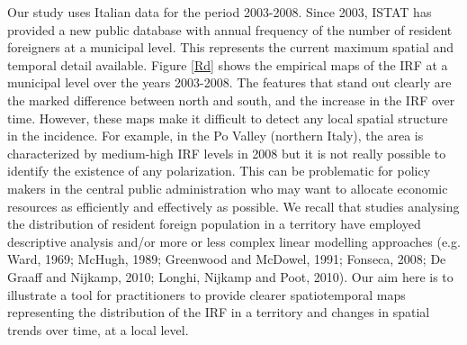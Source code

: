 \documentclass[12pt]{article}
\theoremstyle{definition}
\theoremstyle{plain}
\begin{document}
Our study uses Italian data for the period 2003-2008. Since 2003, ISTAT has provided a new public database with annual frequency of the number of resident foreigners at a municipal level. This represents the current maximum spatial and temporal detail available. Figure \ref{Rd} shows the empirical maps of the IRF at a municipal level over the years 2003-2008. The features that stand out clearly are the marked difference between north and south, and the increase in the IRF over time. However, these maps make it difficult to detect any local spatial structure in the incidence. For example, in the Po Valley (northern Italy), the area is characterized by medium-high IRF levels in 2008 but it is not really possible to identify the existence of any polarization. This can be problematic for policy makers in the central public administration who may want to allocate economic resources as efficiently and effectively as possible. We recall that studies analysing the distribution of resident foreign population in a territory have employed descriptive analysis and/or more or less complex linear modelling approaches (e.g. Ward, 1969; McHugh, 1989; Greenwood and McDowel, 1991; Fonseca, 2008; De Graaff and Nijkamp, 2010; Longhi, Nijkamp and Poot, 2010). Our aim here is to illustrate a tool for practitioners to provide clearer spatiotemporal maps representing the distribution of the IRF in a territory and changes in spatial trends over time, at a local level. 
\end{document}
